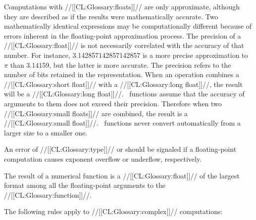 \endsubsubsection%



Computations with //[[CL:Glossary:floats]]// are only approximate,
although they are described as if the results
were mathematically accurate. 
Two mathematically identical
expressions may be computationally different because of errors
inherent in the floating-point approximation process.
The precision of a //[[CL:Glossary:float]]// is not necessarily
correlated with the accuracy of that number.
For instance, 3.142857142857142857 is a more precise approximation
to $\pi$ than 3.14159, but the latter is more accurate.
The precision refers to the number of bits retained in the representation.
When an operation combines a //[[CL:Glossary:short float]]// with a 
//[[CL:Glossary:long float]]//,
the result will be a //[[CL:Glossary:long float]]//. 
\clisp\ functions assume that the accuracy of
arguments to them does not exceed their precision.  Therefore
when two //[[CL:Glossary:small floats]]// 
are combined, the result is a //[[CL:Glossary:small float]]//. 
\clisp\ functions 
never convert automatically from a larger size to a smaller one.
\endsubsubsection%



An error of //[[CL:Glossary:type]]// 
or  should be signaled if a 
floating-point computation causes exponent overflow or underflow, respectively.

\endsubsubsection%









The result of a numerical function is a //[[CL:Glossary:float]]// of the 
largest format among all the floating-point arguments to the //[[CL:Glossary:function]]//. 

\endsubsubsection%

\endsubsection%


The following rules apply to //[[CL:Glossary:complex]]// computations:

